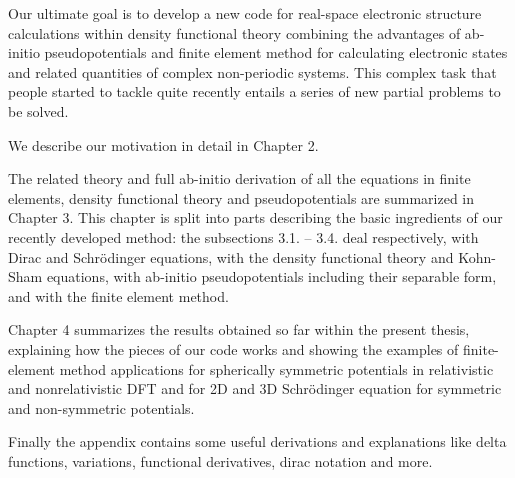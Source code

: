 Our ultimate goal is to develop a new code for real-space electronic structure
calculations within density functional theory combining the advantages
of ab-initio pseudopotentials and finite element method for calculating
electronic states and related quantities of complex non-periodic systems.
This complex task that people started to tackle quite recently
\cite{pask1, pask2, ortiz1, ortiz2}
entails a series of new partial problems to be solved.

We describe our motivation in detail in Chapter 2.

The related theory and full ab-initio derivation of all the equations
in finite elements, density functional theory and pseudopotentials
are summarized in Chapter 3.
This chapter is split into parts describing the basic ingredients of our
recently developed method: the subsections 3.1. -- 3.4. deal respectively,
with Dirac and Schr\"odinger equations, with the density functional theory and
Kohn-Sham equations, with ab-initio pseudopotentials including their separable
form, and with the finite element method.


Chapter 4 summarizes the results obtained so far within the
present thesis, explaining how the pieces of our code works and showing
the examples of finite-element method applications for spherically symmetric
potentials in relativistic and nonrelativistic DFT and for 2D and 3D
Schr\"odinger equation for symmetric and non-symmetric potentials.

Finally the appendix contains some useful derivations and explanations like
delta functions, variations, functional derivatives, dirac notation and more.
